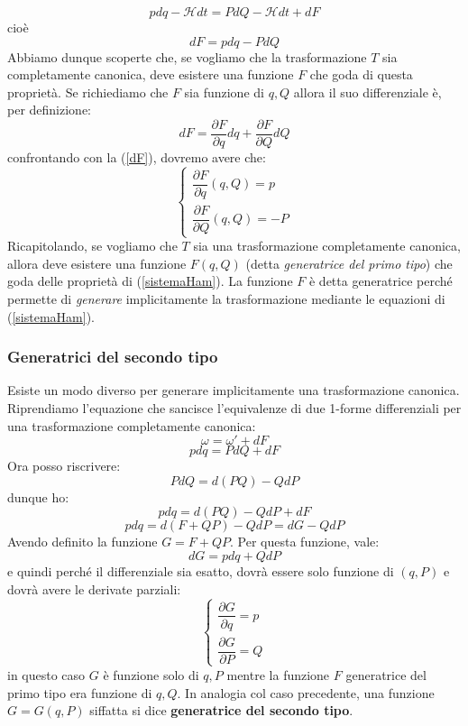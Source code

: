\documentclass[a4paper,openany]{article}
\begin{document}
\begin{equation*}\label{key}
	pdq-\mathcal{H}dt = PdQ-\mathcal{H}dt + dF
\end{equation*}
cioè
\begin{equation}
	dF = pdq - PdQ
	\label{dF}
\end{equation}
Abbiamo dunque scoperte che, se vogliamo che la trasformazione $T$ sia completamente canonica, deve esistere una funzione $F$ che goda di questa proprietà. Se richiediamo che $F$ sia funzione di $q,Q$ allora il suo differenziale è, per definizione:
$$
dF = \dfrac{\partial F}{\partial q}dq+\dfrac{\partial F}{\partial Q}dQ
$$
confrontando con la (\ref{dF}), dovremo avere che:
\begin{equation}
	\begin{cases}
		\dfrac{\partial F}{\partial q}(q,Q)=p \\[8pt]
		\dfrac{\partial F}{\partial Q}(q,Q) = -P
	\end{cases}
\label{sistemaHam}
\end{equation}
Ricapitolando, se vogliamo che $T$ sia una trasformazione completamente canonica, allora deve esistere una funzione $F(q,Q)$ (detta \textit{generatrice del primo tipo}) che goda delle proprietà di (\ref{sistemaHam}). La funzione $F$ è detta generatrice perché permette di \textit{generare} implicitamente la trasformazione mediante le equazioni di (\ref{sistemaHam}).
\subsubsection{Generatrici del secondo tipo}
Esiste un modo diverso per generare implicitamente una trasformazione canonica. Riprendiamo l'equazione che sancisce l'equivalenze di due 1-forme differenziali per una trasformazione completamente canonica:
$$
\omega = \omega'+dF
$$
$$
pdq = PdQ + dF
$$
Ora posso riscrivere:
$$
PdQ = d(PQ)-QdP
$$
dunque ho:
$$
pdq = d(PQ)-QdP +dF
$$
$$
pdq = d(F+QP)-QdP = dG - QdP
$$
Avendo definito la funzione $G=F+QP$. Per questa funzione, vale:
$$
dG = pdq + QdP
$$
e quindi perché il differenziale sia esatto, dovrà essere solo funzione di $(q,P)$ e dovrà avere le derivate parziali:
\begin{equation}
	\begin{cases}
		\dfrac{\partial G}{\partial q} = p \\[6pt]
		\dfrac{\partial G}{\partial P} = Q
	\end{cases}
\label{325}
\end{equation}
in questo caso $G$ è funzione solo di $q,P$ mentre la funzione $F$ generatrice del primo tipo era funzione di $q,Q$. In analogia col caso precedente, una funzione $G=G(q,P)$ siffatta si dice \textbf{generatrice del secondo tipo}.
\end{document}
